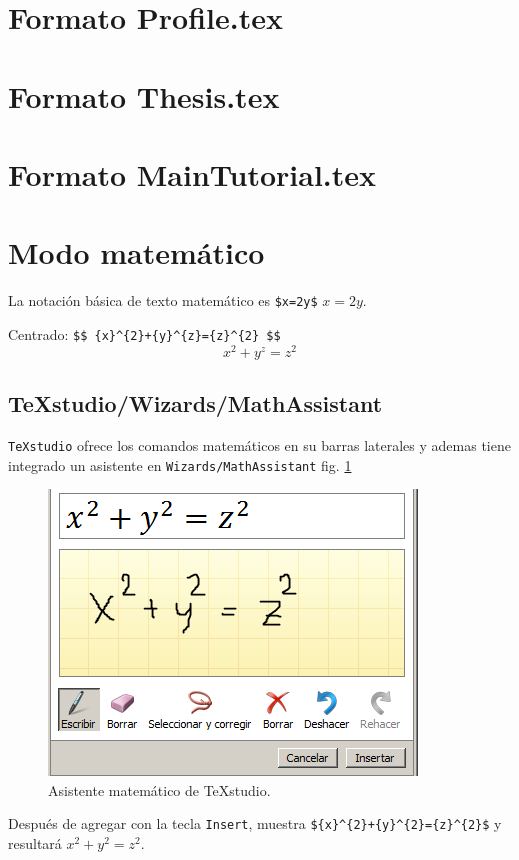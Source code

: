\section{Formato Profile.tex}


\section{Formato Thesis.tex}


\section{Formato MainTutorial.tex}


\section{Modo matemático}
La notación básica de texto matemático es \verb|$x=2y$| $x=2y$.

Centrado:
\verb|$$ {x}^{2}+{y}^{z}={z}^{2} $$|
$$ {x}^{2}+{y}^{z}={z}^{2} $$

\subsection{TeXstudio/Wizards/MathAssistant}
\verb|TeXstudio| ofrece los comandos matemáticos en su barras laterales y ademas tiene integrado un asistente en \verb|Wizards/MathAssistant| fig. \ref{fig:TeXstudioMath}
\begin{figure}[H]
	\centering
	\includegraphics[width=0.3\linewidth]{Figures/TeXstudioMath}
	\caption{Asistente matemático de TeXstudio.}
	\label{fig:TeXstudioMath}
\end{figure}

Después de agregar con la tecla \verb|Insert|, muestra \verb|${x}^{2}+{y}^{2}={z}^{2}$| y resultará ${x}^{2}+{y}^{2}={z}^{2}$.

